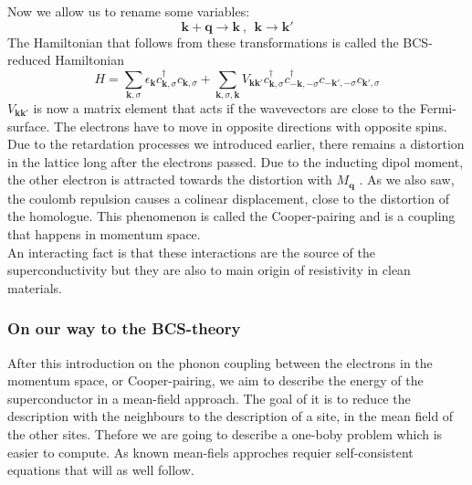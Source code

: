 \documentclass[../main.tex]{subfile}
\begin{document}
Now we allow us to rename some variables:
\[
    \bm{k} + \bm{q} \longrightarrow \bm{k} ~,~~ \bm{k} \longrightarrow \bm{k}'
\]
The Hamiltonian that follows from these transformations is called the BCS-reduced Hamiltonian
\begin{equation} \label{eq:BCS_ReducedHamiltonian}
    H = \sum_{\bm{k},\sigma} \epsilon_{\bm{k}} c_{\bm{k},\sigma}^{\dagger}c_{\bm{k},\sigma} + \sum_{\bm{k},\sigma,\bm{k}} V_{\bm{k}\bm{k}'} c_{\bm{k},\sigma}^{\dagger}c_{-\bm{k},-\sigma}^{\dagger}c_{-\bm{k}',-\sigma}c_{\bm{k}',\sigma}
\end{equation}
$V_{\bm{k}\bm{k}'}$ is now a matrix element that acts if the wavevectors are close to the Fermi-surface. The electrons have to move in opposite directions with opposite spins.
Due to the retardation processes we introduced earlier, there remains a distortion in the lattice long after the electrons passed. Due to the inducting dipol moment,
the other electron is attracted towards the distortion with $M_{\bm{q}}$ . As we also saw, the coulomb repulsion causes a colinear displacement, close to the distortion
of the homologue. This phenomenon is called the Cooper-pairing and is a coupling that happens in momentum space.\\

An interacting fact is that these interactions are the source of the superconductivity but they are also to main origin of resistivity in clean materials.

\subsubsection{On our way to the BCS-theory}
After this introduction on the phonon coupling between the electrons in the momentum space, or Cooper-pairing,
we aim to describe the energy of the superconductor in a mean-field approach. The goal of it is to reduce the description
with the neighbours to the description of a site, in the mean field of the other sites. Thefore we are going to describe 
a one-boby problem which is easier to compute. As known mean-fiels approches requier self-consistent equations that will as well follow.\\
\end{document}
